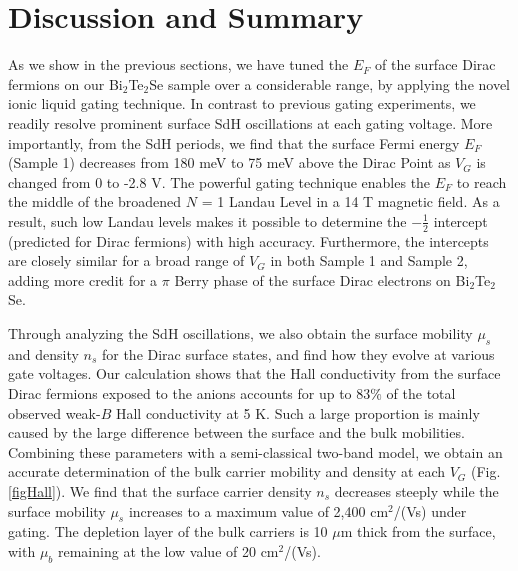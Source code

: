 \section{Discussion and Summary}
\label{sec:liquid:discussion}

As we show in the previous sections, we have tuned the $E_F$ of the surface Dirac fermions on our Bi$_2$Te$_2$Se sample over a considerable range, by applying the novel ionic liquid gating technique. In contrast to previous gating experiments, we readily resolve prominent surface SdH oscillations at each gating voltage. More importantly, from the SdH periods, we find that the surface Fermi energy $E_F$
(Sample 1) decreases from 180 meV to 75 meV above the Dirac Point as $V_G$ is changed from 0 to -2.8 V. The powerful gating technique enables the $E_F$ to reach the middle of the broadened $N$ = 1 Landau Level in a 14 T magnetic field. As a result, such low Landau levels makes it possible to determine the $-\frac12$ intercept (predicted for Dirac fermions) with high accuracy.
Furthermore, the intercepts are closely similar for a broad range of $V_G$ in both Sample 1 and Sample 2, adding more credit for a $\pi$ Berry phase of the surface Dirac electrons on Bi$_2$Te$_2$Se.

Through analyzing the SdH oscillations, we also obtain the surface mobility $\mu_s$ and density $n_s$ for the Dirac surface states, and find how they evolve at various gate voltages. Our calculation shows that the Hall conductivity from the surface Dirac fermions exposed to the anions accounts
for up to 83$\%$ of the total observed weak-$B$ Hall conductivity at 5 K. Such a large proportion is mainly caused by the large difference between the surface and the bulk mobilities. Combining these parameters with a semi-classical two-band model, we obtain an accurate determination
of the bulk carrier mobility and density at each $V_G$ (Fig. \ref{figHall}). We find that the surface carrier density $n_s$ decreases steeply while the surface mobility
$\mu_s$ increases to a maximum value of 2,400 cm$^2$/(Vs) under gating. The depletion layer of the bulk carriers is 10 $\mu$m thick from the 
surface, with $\mu_b$ remaining at the low value of 20 cm$^2$/(Vs).



